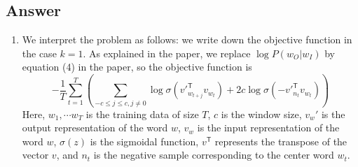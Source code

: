 \documentclass[
	12pt, %
]{../Template/fphw}
\newcommand{\T}{\mathsf{T}}
\begin{document}
\subsection*{Answer}
\begin{enumerate}[label=(\arabic*)]
    \item We interpret the problem as follows: we write down the objective function in the case $k=1$. As explained in the paper, we replace $\log P(w_{O}|w_{I})$ by equation (4) in the paper, so the objective function is
    \begin{equation}
        -\frac{1}{T}\sum_{t=1}^{T}\left(\sum_{-c\leq j\leq c, j\neq 0}\log{\sigma(v'^\T_{w_{t+j}} v_{w_t})} + 2c\log{\sigma(-v'^\T_{n_t} v_{w_t})}\right) \label{eqn: objective_ns}
    \end{equation}
    Here, $w_1,\cdots w_T$ is the training data of size $T$, $c$ is the window size, $v_{w}'$ is the output representation of the word $w$, $v_w$ is the input representation of the word $w$, $\sigma(z)$ is the sigmoidal function, $v^\T$ represents the transpose of the vector $v$, and $n_t$ is the negative sample corresponding to the center word $w_t$.


\end{enumerate}
\end{document}
